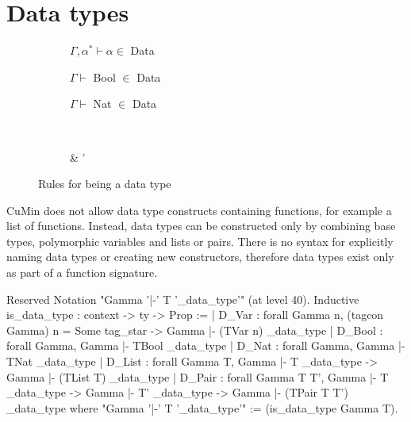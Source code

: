 \documentclass[paper = a4, fleqn, abstract=on, twoside]{scrreprt}
\begin{document}
\section{Data types}
\begin{figure}[H]
	\begin{center}
		\begin{subfigure}{.25 \linewidth}
			\centering
			$\Gamma, \alpha^{*} \vdash \alpha \in$ Data
		\end{subfigure}
		\begin{subfigure}{.25 \linewidth}
			\centering
			$\Gamma \vdash$ Bool $\in$ Data
		\end{subfigure}
		\begin{subfigure}{.25 \linewidth}
			\centering
			$\Gamma \vdash$ Nat $\in$ Data
		\end{subfigure}\\
		\vspace{1em}
		\begin{subfigure}{.375 \linewidth}
			\centering
			      {\Gamma \vdash \tau \in {}}
		\end{subfigure}
		\hspace{.1 \linewidth}
		\begin{subfigure}{.375 \linewidth}
			\centering
			      {\Gamma \vdash \tau \in {} & \Gamma \vdash \tau' \in {}}
		\end{subfigure}
	\end{center}
	\caption{Rules for being a data type}
\end{figure}
CuMin does not allow data type constructs containing functions, for example a list of functions. Instead, data types can be constructed only by combining base types, polymorphic variables and lists or pairs. There is no syntax for explicitly naming data types or creating new constructors, therefore data types exist only as part of a function signature.
\begin{coqcode}
Reserved Notation "Gamma '|-' T '\is_data_type'" (at level 40).
Inductive is_data_type : context -> ty -> Prop :=
  | D_Var  : forall Gamma n,
               (tagcon Gamma) n  = Some tag_star ->
               Gamma |- (TVar n) \is_data_type
  | D_Bool : forall Gamma, Gamma |- TBool \is_data_type
  | D_Nat  : forall Gamma, Gamma |- TNat \is_data_type
  | D_List : forall Gamma T,
               Gamma |- T \is_data_type ->
               Gamma |- (TList T) \is_data_type
  | D_Pair : forall Gamma T T', 
               Gamma |- T \is_data_type ->
               Gamma |- T' \is_data_type ->
               Gamma |- (TPair T T') \is_data_type
where "Gamma '|-' T '\is_data_type'" := (is_data_type Gamma T).
\end{coqcode}
\end{document}

